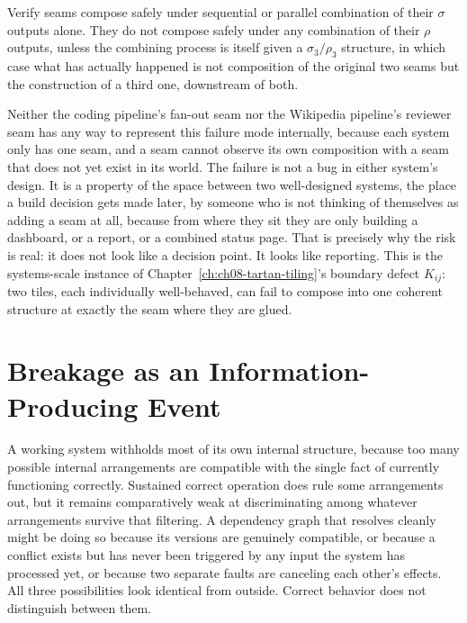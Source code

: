 \begin{corollary}
Verify seams compose safely under sequential or parallel combination of their $\sigma$ outputs alone. They do not compose safely under any combination of their $\rho$ outputs, unless the combining process is itself given a $\sigma_3/\rho_3$ structure, in which case what has actually happened is not composition of the original two seams but the construction of a third one, downstream of both.
\end{corollary}

Neither the coding pipeline's fan-out seam nor the Wikipedia pipeline's reviewer seam has any way to represent this failure mode internally, because each system only has one seam, and a seam cannot observe its own composition with a seam that does not yet exist in its world. The failure is not a bug in either system's design. It is a property of the space between two well-designed systems, the place a build decision gets made later, by someone who is not thinking of themselves as adding a seam at all, because from where they sit they are only building a dashboard, or a report, or a combined status page. That is precisely why the risk is real: it does not look like a decision point. It looks like reporting. This is the systems-scale instance of Chapter~\ref{ch:ch08-tartan-tiling}'s boundary defect $K_{ij}$: two tiles, each individually well-behaved, can fail to compose into one coherent structure at exactly the seam where they are glued.

\section{Breakage as an Information-Producing Event}

A working system withholds most of its own internal structure, because too many possible internal arrangements are compatible with the single fact of currently functioning correctly. Sustained correct operation does rule some arrangements out, but it remains comparatively weak at discriminating among whatever arrangements survive that filtering. A dependency graph that resolves cleanly might be doing so because its versions are genuinely compatible, or because a conflict exists but has never been triggered by any input the system has processed yet, or because two separate faults are canceling each other's effects. All three possibilities look identical from outside. Correct behavior does not distinguish between them.

